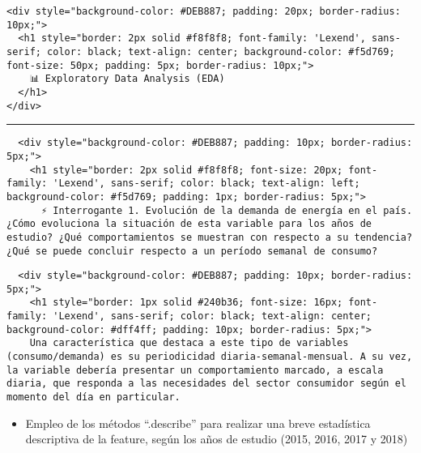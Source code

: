 \documentclass[11pt]{article}
\providecommand{\tightlist}{%
      \setlength{\itemsep}{0pt}\setlength{\parskip}{0pt}}
\begin{document}
\begin{verbatim}
<div style="background-color: #DEB887; padding: 20px; border-radius: 10px;">
  <h1 style="border: 2px solid #f8f8f8; font-family: 'Lexend', sans-serif; color: black; text-align: center; background-color: #f5d769; font-size: 50px; padding: 5px; border-radius: 10px;">
    📊 Exploratory Data Analysis (EDA)
  </h1>
</div>
\end{verbatim}

\begin{center}\rule{0.5\linewidth}{0.5pt}\end{center}

    \begin{verbatim}
  <div style="background-color: #DEB887; padding: 10px; border-radius: 5px;">
    <h1 style="border: 2px solid #f8f8f8; font-size: 20px; font-family: 'Lexend', sans-serif; color: black; text-align: left; background-color: #f5d769; padding: 1px; border-radius: 5px;">
      ⚡ Interrogante 1. Evolución de la demanda de energía en el país. ¿Cómo evoluciona la situación de esta variable para los años de estudio? ¿Qué comportamientos se muestran con respecto a su tendencia? ¿Qué se puede concluir respecto a un período semanal de consumo?
\end{verbatim}

    \begin{verbatim}
  <div style="background-color: #DEB887; padding: 10px; border-radius: 5px;">
    <h1 style="border: 1px solid #240b36; font-size: 16px; font-family: 'Lexend', sans-serif; color: black; text-align: center; background-color: #dff4ff; padding: 10px; border-radius: 5px;">
    Una característica que destaca a este tipo de variables (consumo/demanda) es su periodicidad diaria-semanal-mensual. A su vez, la variable debería presentar un comportamiento marcado, a escala diaria, que responda a las necesidades del sector consumidor según el momento del día en particular.
\end{verbatim}

    \begin{itemize}
\tightlist
\item
  Empleo de los métodos ``.describe'' para realizar una breve
  estadística descriptiva de la feature, según los años de estudio
  (2015, 2016, 2017 y 2018)
\end{itemize}
\end{document}
